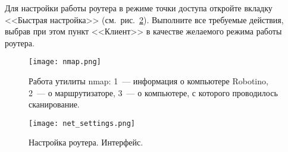 Для настройки работы роутера в режиме точки доступа откройте вкладку <<Быстрая настройка>> (см.~рис.~\ref{img_net_settings}).
Выполните все требуемые действия, выбрав при этом пункт <<Клиент>> в качестве желаемого режима работы роутера.

\begin{figure}[p]
	\centering
	\texttt{[image: nmap.png]}
	\caption{Работа утилиты nmap: 1~--- информация о компьютере Robotino, 2~--- о маршрутизаторе, 3~--- о компьютере, с которого проводилось сканирование.}
	\label{img_nmap}
\end{figure}

\begin{figure}[p]
	\centering
	\texttt{[image: net\_settings.png]}
	\caption{Настройка роутера. Интерфейс.}
	\label{img_net_settings}
\end{figure}
